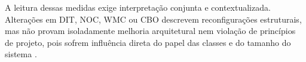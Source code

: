 A leitura dessas medidas exige interpretação conjunta e contextualizada. Alterações em DIT, NOC, WMC ou CBO descrevem reconfigurações estruturais, mas não provam isoladamente melhoria arquitetural nem violação de princípios de projeto, pois sofrem influência direta do papel das classes e do tamanho do sistema \cite{elemam:01,aniche:16}.
